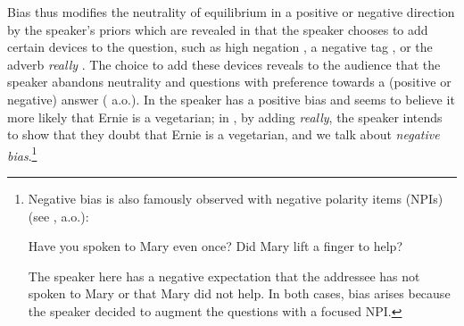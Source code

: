\documentclass[output=paper,colorlinks,citecolor=brown]{langscibook}
\begin{document}
Bias thus modifies the neutrality of equilibrium in a positive or negative direction by the speaker's priors which are revealed in that the speaker chooses to add certain devices to the question, such as high negation , a negative tag , or the adverb \textit{really} . The choice  to add these devices reveals to the audience that the speaker abandons neutrality and questions with preference towards a (positive or negative) answer (\citealt{sadock1971, ladd1981, abels2003, van2003, romero2004, Reese2007, asher2007, krifka2015SALT, malamud2015, roelofsen2015, larrivee2022, giannakidoumari2021a, giannakidoumari2021b} a.o.). In  the speaker has a positive bias and seems to believe it more likely that Ernie is a vegetarian; in , by adding \textit{really}, the speaker intends to show that they doubt that Ernie is a vegetarian, and we talk about \textit{negative bias}.\footnote{Negative bias is also famously observed with negative polarity items (NPIs)  (see \citealt{borkin1971, giannakidou1997, giannakidou2007, van2003, guerzoni2004, guerzoni2007}, a.o.): 

\ea 
\ea Have you spoken to Mary even once?	
\ex Did Mary lift a finger to help?		
\z
\z


The speaker here has a negative expectation that the addressee has not spoken to Mary or that Mary did not help. In both cases, bias arises because the speaker decided to augment the questions with a focused NPI.} 
\end{document}
